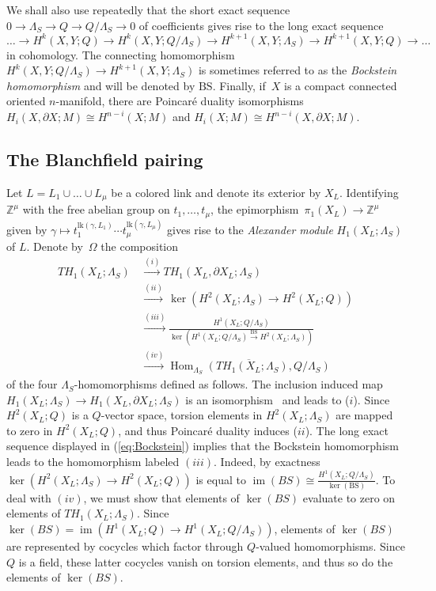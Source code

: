 \documentclass[11pt,a4paper]{amsart}
\theoremstyle{definition}
\newcommand{\im}{\operatorname{im}}
\DeclareMathOperator{\Hom}{Hom}
\begin{document}
We shall also use repeatedly that the short exact sequence $0 \to \Lambda_S \to Q \to Q/\Lambda_S \to 0$ of coefficients gives rise to the long exact sequence 
\begin{equation}
\label{eq:Bockstein}
 \ldots \to H^k(X,Y;Q) \to H^k(X,Y;Q/\Lambda_S) \to H^{k+1}(X,Y;\Lambda_S) \to H^{k+1}(X,Y;Q) \to \ldots
\end{equation}
in cohomology. The connecting homomorphism $H^k(X,Y;Q/\Lambda_S) \to H^{k+1}(X,Y;\Lambda_S)$ is sometimes referred to as the \emph{Bockstein homomorphism} and will be denoted by $\text{BS}$. Finally, if~$X$ is a compact connected oriented $n$-manifold, there are  Poincar\'e duality isomorphisms $H_i(X,\partial X;M) \cong H^{n-i}(X;M)$ and $H_i(X;M)  \cong H^{n-i}(X,\partial X;M).$

\subsection{The Blanchfield pairing}
\label{sub:Blanchfield}

Let $L=L_1 \cup \dots \cup L_\mu$ be a colored link and denote its exterior by $X_L$. Identifying $\mathbb{Z}^\mu$ with the free abelian group on $t_1,\dots,t_\mu$, the epimorphism~$ \pi_1(X_L) \rightarrow \mathbb{Z}^\mu$ given by $\gamma \mapsto t_1^{\text{lk}(\gamma,L_1)}\cdots t_\mu^{\text{lk}(\gamma,L_\mu)}$ gives rise to the \textit{Alexander module} $H_1(X_L;\Lambda_S)$ of $L$.
Denote by~$\Omega$ the composition
\begin{align*}
TH_1(X_L;\Lambda_S) \,
 & \xrightarrow{(i)} TH_1(X_L,\partial X_L;\Lambda_S)  \\
 & \xrightarrow{(ii)}\, \ker(H^2(X_L;\Lambda_S) \to H^2(X_L;Q))  \\
  & \xrightarrow{(iii)}   \frac{H^1(X_L;Q/\Lambda_S)}{\ker( H^1(X_L;Q/\Lambda_S) \stackrel{\text{BS}}{\to} H^2(X_L;\Lambda_S) )} \\
 & \xrightarrow{(iv)}  \overline{\Hom_{\Lambda_S}(TH_1(X_L;\Lambda_S),Q/\Lambda_S)}
\end{align*}
of the four $\Lambda_S$-homomorphisms defined as follows. The inclusion induced map $H_1(X_L;\Lambda_S) \to H_1(X_L,\partial X_L;\Lambda_S)$ is an isomorphism~\cite[Lemma 2.2]{ConwayFriedlToffoli} and leads to ($i$). Since $H^2(X_L;Q)$ is a $Q$-vector space, torsion elements in $H^2(X_L;\Lambda_S)$ are mapped to zero in $H^2(X_L;Q)$, and thus Poincar\'e duality induces ($ii$). The long exact sequence displayed in (\ref{eq:Bockstein}) implies that the Bockstein homomorphism leads to the homomorphism labeled $(iii)$. Indeed, by exactness $\ker(H^2(X_L;\Lambda_S) \to H^2(X_L;Q))$ is equal to $\im(BS) \cong \frac{H^1(X_L;Q/\Lambda_S)}{\ker(\text{BS})}$. To deal with $(iv)$, we must show that elements of $\ker(BS)$ evaluate to zero on elements of $TH_1(X_L;\Lambda_S)$. Since $\ker(BS)=\im(H^1(X_L;Q) \to H^1(X_L;Q/\Lambda_S))$, elements of $\ker(BS)$ are represented by cocycles which factor through $Q$-valued homomorphisms. Since $Q$ is a field, these latter cocycles vanish on torsion elements, and thus so do the elements of $\ker(BS)$.
\end{document}
